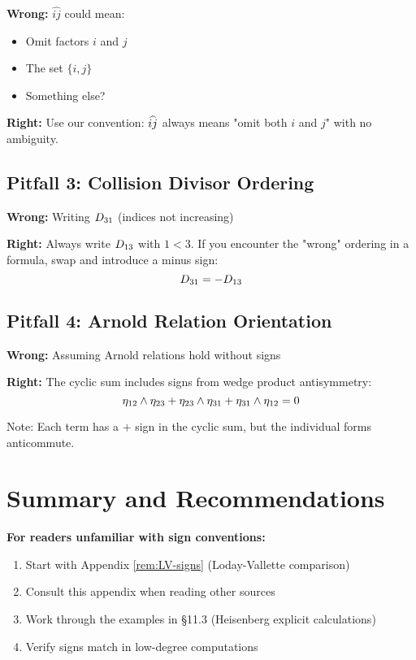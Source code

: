 \textbf{Wrong:} $\widehat{ij}$ could mean:
\begin{itemize}
\item Omit factors $i$ and $j$
\item The set $\{i, j\}$
\item Something else?
\end{itemize}

\textbf{Right:} Use our convention: $\widehat{ij}$ always means "omit both $i$ and $j$" with no ambiguity.

\subsection{Pitfall 3: Collision Divisor Ordering}

\textbf{Wrong:} Writing $D_{31}$ (indices not increasing)

\textbf{Right:} Always write $D_{13}$ with $1 < 3$. If you encounter the "wrong" ordering in a formula, swap and introduce a minus sign:
$$D_{31} = -D_{13}$$

\subsection{Pitfall 4: Arnold Relation Orientation}

\textbf{Wrong:} Assuming Arnold relations hold without signs

\textbf{Right:} The cyclic sum includes signs from wedge product antisymmetry:
$$\eta_{12} \wedge \eta_{23} + \eta_{23} \wedge \eta_{31} + \eta_{31} \wedge \eta_{12} = 0$$

Note: Each term has a $+$ sign in the cyclic sum, but the individual forms anticommute.

\section{Summary and Recommendations}

\textbf{For readers unfamiliar with sign conventions:}
\begin{enumerate}
\item Start with Appendix \ref{rem:LV-signs} (Loday-Vallette comparison)
\item Consult this appendix when reading other sources
\item Work through the examples in \S 11.3 (Heisenberg explicit calculations)
\item Verify signs match in low-degree computations
\end{enumerate}

